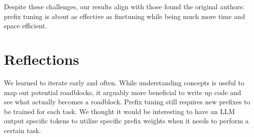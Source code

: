 \documentclass[11pt]{article} %
\begin{document}
Despite these challenges, our results align with those found the original authors: prefix tuning is about as effective as finetuning while being much more time and space efficient.

\section{Reflections}
We learned to iterate early and often. While understanding concepts is useful to map out potential roadblocks, it arguably more beneficial to write up code and see what actually becomes a roadblock. Prefix tuning still requires new prefixes to be trained for each task. We thought it would be interesting to have an LLM output specific tokens to utilize specific prefix weights when it needs to perform a certain task.


\end{document}
